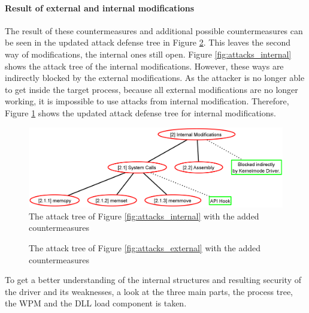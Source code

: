 \paragraph{Result of external and internal modifications}
The result of these countermeasures and additional possible countermeasures can be seen in the updated attack defense tree in Figure \ref{fig:attacks_external_def}. This leaves the second way of modifications, the internal ones still open. Figure \ref{fig:attacks_internal} shows the attack tree of the internal modifications. However, these ways are indirectly blocked by the external modifications. As the attacker is no longer able to get inside the target process, because all external modifications are no longer working, it is impossible to use attacks from internal modification. Therefore, Figure \ref{fig:attacks_internal_def} shows the updated attack defense tree for internal modifications.
\begin{figure}[htbp]
\centering
\includegraphics[scale=0.25]{sections/adtrees/InternalModifications.png}
\caption{The attack tree of Figure \ref{fig:attacks_internal} with the added countermeasures}
\label{fig:attacks_internal_def}
\end{figure}
\begin{figure}[h] 
 \centering
\caption{The attack tree of Figure \ref{fig:attacks_external} with the added countermeasures}
\label{fig:attacks_external_def}
\end{figure}
\restoregeometry
To get a better understanding of the internal structures and resulting security of the driver and its weaknesses, a look at the three main parts, the process tree, the \gls{WPM} and the \gls{DLL} load component is taken.

